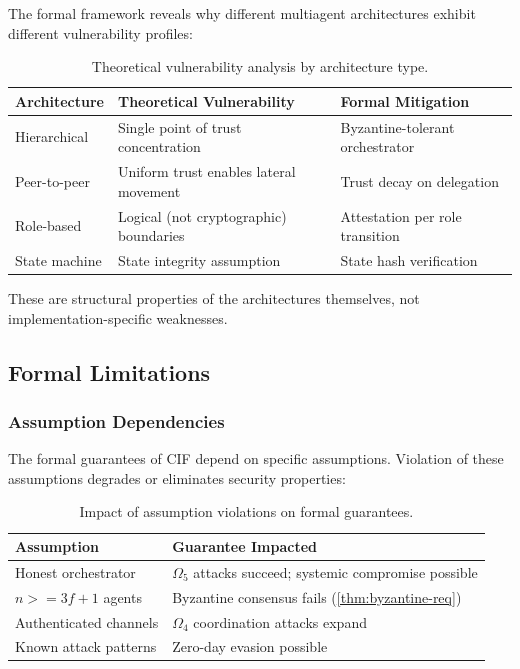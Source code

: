 \documentclass[
]{article}
\begin{document}
The formal framework reveals why different multiagent architectures
exhibit different vulnerability profiles:

\begin{table}[htbp]
\centering
\caption{Theoretical vulnerability analysis by architecture type.}
\label{tab:architecture-theory}
\begin{tabular}{@{}lll@{}}
\toprule
Architecture & Theoretical Vulnerability & Formal Mitigation \\
\midrule
Hierarchical & Single point of trust concentration & Byzantine-tolerant orchestrator \\
Peer-to-peer & Uniform trust enables lateral movement & Trust decay on delegation \\
Role-based & Logical (not cryptographic) boundaries & Attestation per role transition \\
State machine & State integrity assumption & State hash verification \\
\bottomrule
\end{tabular}
\end{table}

These are structural properties of the architectures themselves, not
implementation-specific weaknesses.

\subsection{Formal Limitations}\label{sec:formal-limitations}

\subsubsection{Assumption Dependencies}\label{assumption-dependencies}

The formal guarantees of CIF depend on specific assumptions. Violation
of these assumptions degrades or eliminates security properties:

\begin{table}[htbp]
\centering
\caption{Impact of assumption violations on formal guarantees.}
\label{tab:assumption-violations}
\begin{tabular}{@{}lp{5cm}@{}}
\toprule
Assumption & Guarantee Impacted \\
\midrule
Honest orchestrator & $\Omega_5$ attacks succeed; systemic compromise possible \\
$n >= 3f+1$ agents & Byzantine consensus fails (\cref{thm:byzantine-req}) \\
Authenticated channels & $\Omega_4$ coordination attacks expand \\
Known attack patterns & Zero-day evasion possible \\
\bottomrule
\end{tabular}
\end{table}
\end{document}
